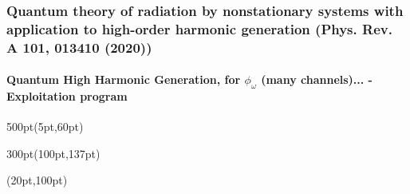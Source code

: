 





\begin{frame}
\frametitle{Quantum theory of radiation by nonstationary systems 
        with application to high-order harmonic generation
        (Phys. Rev. A 101, 013410 (2020))}
        \framesubtitle{Quantum High Harmonic Generation, 
        for $\phi_\omega$ (many channels)... - Exploitation program}
\small
\begin{textblock*}{500pt}(5pt,60pt)
 \begin{minipage}{0.0\linewidth}
 \begin{figure}[tp]
 \end{figure}

\end{minipage}
\end{textblock*}

\begin{textblock*}{300pt}(100pt,137pt)
\end{textblock*}


\begin{textblock*}{\linewidth}(20pt,100pt)
\end{textblock*}
%
%
%
%

\end{frame}





